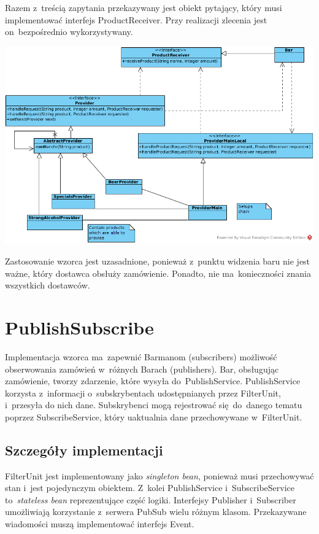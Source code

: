 \documentclass[11pt]{aghdpl}
\begin{document}
Razem z~treścią zapytania przekazywany jest obiekt pytający, który musi implementować interfejs ProductReceiver. Przy realizacji zlecenia jest on~bezpośrednio wykorzystywany.
\begin{center}
 \includegraphics[width=16cm]{chain}
\end{center}

Zastosowanie wzorca jest uzasadnione, ponieważ z~punktu widzenia baru nie jest ważne, który dostawca obsłuży zamówienie. Ponadto, nie ma~konieczności znania wszystkich dostawców.

\section{PublishSubscribe}
Implementacja wzorca ma~zapewnić Barmanom (subscribers) możliwość obserwowania zamówień w~różnych Barach (publishers). Bar, obsługując zamówienie, tworzy zdarzenie, które wysyła do~PublishService. PublishService korzysta z~informacji o~subskrybentach udostępnianych przez FilterUnit, i~przesyła do nich dane. Subskrybenci mogą rejestrować się~do~danego tematu poprzez SubscribeService, który uaktualnia dane przechowywane w~FilterUnit.

\subsection{Szczegóły implementacji}
FilterUnit jest implementowany jako \textit{singleton bean}, ponieważ musi przechowywać stan i~jest pojedynczym obiektem. Z~kolei PublishService i~SubscribeService to~\textit{stateless bean} reprezentujące część logiki. Interfejsy Publisher i~Subscriber umożliwiają korzystanie z~serwera PubSub wielu różnym klasom. Przekazywane wiadomości muszą implementować interfejs Event.
\end{document}

